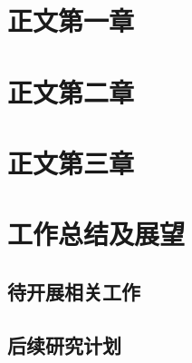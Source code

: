 \documentclass[midterm]{../package/ecpknproposal}
\begin{document}
\section{正文第一章}

\section{正文第二章}

\section{正文第三章}

\section{工作总结及展望}
\subsection{待开展相关工作}
\subsection{后续研究计划}


\newpage

{}
\small


\nocite{*}
\end{document}

